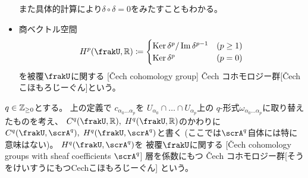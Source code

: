 \documentclass[report]{jlreq}
\begin{document}
\begin{definition}
\begin{itemize}
            また具体的計算により$\delta \circ \delta = 0$をみたすこともわかる。
        \item 商ベクトル空間
            \begin{equation}
                H^p(\frakU, \R)
                    \coloneqq \begin{cases}
                        \Ker \delta^{p} / \Im \delta^{p - 1} & (p \ge 1) \\
                        \Ker \delta^{p} & (p = 0)
                    \end{cases}
            \end{equation}
            を被覆$\frakU$に関する
            [\v{C}ech cohomology group]
            {\v{C}ech コホモロジー群}[\v{C}ech こほもろじーぐん]という。
    \end{itemize}
\end{definition}


\begin{definition}
    $q \in \mathbb{Z}_{\ge 0}$とする。
    上の定義で
    $c_{\alpha_0 \dots \alpha_p}$を
    $U_{\alpha_0} \cap \dots \cap U_{\alpha_p}$上の
    $q$-形式$\omega_{\alpha_0 \dots \alpha_p}$に取り替えたものを考え、
    $C^q(\frakU, \R), \; H^q(\frakU, \R)$のかわりに
    $C^q(\frakU, \scrA^q), \; H^q(\frakU, \scrA^q)$と書く
    (ここでは$\scrA^q$自体には特に意味はない\footnotemark{})。
    $H^q(\frakU, \scrA^q)$を
    被覆$\frakU$に関する
    [\v{C}ech cohomology groups with sheaf coefficients $\scrA^q$]
    {層を係数にもつ \v{C}ech コホモロジー群}[そうをけいすうにもつCechこほもろじーぐん]
    という。
\end{definition}

\end{document}
